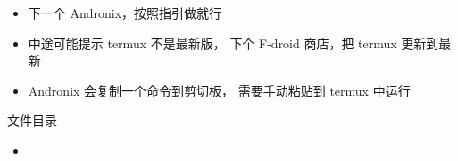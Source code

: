 
\begin{itemize}
\item 下一个 Andronix，按照指引做就行
\item 中途可能提示 termux 不是最新版， 下个 F-droid 商店，把 termux 更新到最新
\item Andronix 会复制一个命令到剪切板， 需要手动粘贴到 termux 中运行

\end{itemize}


文件目录
\begin{itemize}
\item 
\end{itemize}

